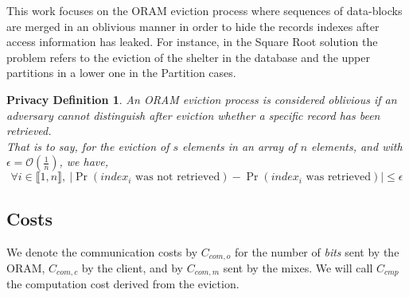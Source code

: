 \documentclass{llncs}
\newtheorem{privdef}{Privacy Definition}
\begin{document}
This work focuses on the ORAM eviction process where sequences of data-blocks are merged in an oblivious manner in order to hide the records indexes after access information has leaked. For instance, in the Square Root solution the problem refers to the eviction of the shelter in the database and the upper partitions in a lower one in the Partition cases.

\iffalse
\begin{privdef}{Eviction Old Security.}
An ORAM eviction process is considered secure if an adversary cannot distinguish after eviction the location of any specific record. 
\end{privdef}
\fi

\begin{privdef}
An ORAM eviction process is considered oblivious if an adversary cannot distinguish after eviction whether a specific record has been retrieved.\\
That is to say, for the eviction of $s$ elements in an array of $n$ elements, and with $\epsilon =\mathcal{O}\left ( \frac{1}{n} \right )$, we have,
$$ \forall i \in \llbracket 1, n \rrbracket,\ |\Pr(index_i \text{ was not retrieved} ) - \Pr(index_i \text{ was retrieved} )| \leq \epsilon$$
\end{privdef}
%
\subsection{Costs}
We denote the communication costs by $C_{com,o}$ for the number of \emph{bits} sent by the ORAM, $C_{com,c}$ by the client, and by $C_{com,m}$ sent by the mixes. 
We will call $C_{cmp}$ the computation cost derived from the eviction.
%
\end{document}
